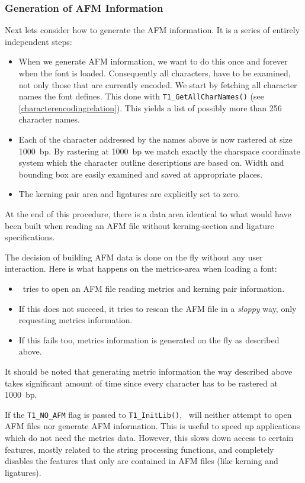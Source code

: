 \subsubsection{Generation of AFM Information}
\label{generatingafminfo}%
Next lets consider how to generate the AFM information. It is a series of
entirely independent steps:
\begin{itemize}
\item When we generate AFM information, we want to do this once and forever
  when the font is loaded. Consequently all characters, have to be examined,
  not only those that are currently encoded. 
  We start by fetching all character names the font defines. This done with
  \verb+T1_GetAllCharNames()+ (see \ref{characterencodingrelation}). This
  yields a list of possibly more than 256 character names.
\item Each of the character addressed by the names above is now rastered at
  size 1000~bp. By rastering at 1000~bp we match exactly the charspace
  coordinate system which the character outline descriptions are
  based on. Width and bounding box are easily examined and saved at
  appropriate places. 
\item The kerning pair area and ligatures are explicitly set to zero.
\end{itemize}
At the end of this procedure, there is a data area identical to what would
have been built when reading an AFM file without kerning-section and ligature
specifications.  

The decision of building AFM data is done on the fly without any user
interaction. Here is what happens on the metrics-area when loading a font:
\begin{itemize}
\item \tonelib\ tries to open an AFM file reading metrics and kerning pair
  information. 
\item If this does not succeed, it tries to rescan the AFM file in a {\em
    sloppy} way, only requesting metrics information.
\item If this fails too, metrics information is generated on the fly as
  described above.
\end{itemize}
It should be noted that generating metric information the way described above
takes significant amount of time since every character has to be rastered at
1000~bp.

If the \verb+T1_NO_AFM+ flag is passed to \verb+T1_InitLib()+,
\tonelib\ will neither attempt to open AFM files nor generate AFM
information.  This is useful to speed up applications which do not
need the metrics data. However, this slows down access to certain features,
mostly related to the string processing functions, and completely disables the
features that only are contained in AFM files (like kerning and ligatures).

